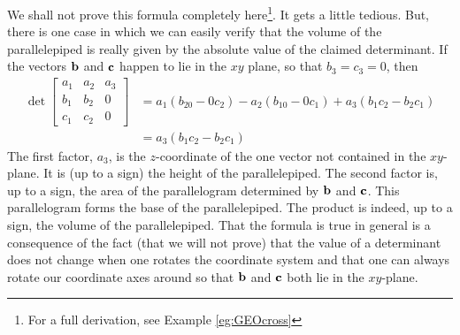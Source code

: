 We shall not prove this formula completely here\footnote{For a full derivation, see Example \ref{eg:GEOcross}}. It gets a little tedious.
But, there is one case in which we can easily verify that the volume of the 
parallelepiped is really given by the absolute value of the
claimed determinant. If the vectors $\mathbf{b}$ and $\mathbf{c}$ happen to lie
in the $xy$ plane, so that $b_3=c_3=0$, then 
\begin{align*}
\det\left[\begin{matrix}a_1&a_2&a_3\\ b_1&b_2&0\\ c_1&c_2&0\end{matrix}\right]
&=a_1(b_20-0c_2) -a_2(b_10-0c_1) +a_3(b_1c_2-b_2c_1)\\
&=a_3(b_1c_2-b_2c_1)
\end{align*}
The first factor, $a_3$, is the $z$-coordinate of the one vector not contained in the $xy$-plane. It 
is (up to a sign) the height of the parallelepiped. The second factor is,
up to a sign, the area of the parallelogram determined by $\mathbf{b}$
and $\mathbf{c}$. This parallelogram forms the base of the parallelepiped. 
The product is indeed, up to a sign, the volume of the parallelepiped.
That the formula is true in general is a consequence of the fact (that
we will not prove) that the value of a determinant does not change when
one rotates the coordinate system and that one can always rotate
our coordinate axes around so that $\mathbf{b}$ and $\mathbf{c}$ both lie in the
$xy$-plane. 


